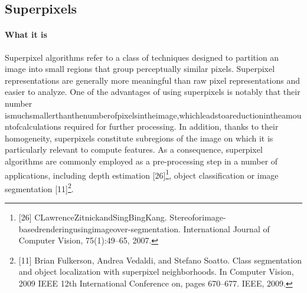 \documentclass{article}
\begin{document}
    \subsection{Superpixels}
            \paragraph{What it is}Superpixel algorithms refer to a class of techniques designed to partition an image into small regions that group perceptually similar pixels. Superpixel representations are generally more meaningful than raw pixel representations and easier to analyze. One of the advantages of using superpixels is notably that their number ismuchsmallerthanthenumberofpixelsintheimage,whichleadstoareductionintheamountofcalculations required for further processing. In addition, thanks to their homogeneity, superpixels constitute subregions of the image on which it is particularly relevant to compute features. As a consequence, superpixel algorithms are commonly employed as a pre-processing step in a number of applications, including depth estimation [26]\footnote{[26] CLawrenceZitnickandSingBingKang. Stereoforimage-basedrenderingusingimageover-segmentation. International Journal of Computer Vision, 75(1):49–65, 2007.}, object classification or image segmentation [11]\footnote{[11] Brian Fulkerson, Andrea Vedaldi, and Stefano Soatto. Class segmentation and object localization with superpixel neighborhoods. In Computer Vision, 2009 IEEE 12th International Conference on, pages 670–677. IEEE, 2009.}.
\end{document}
